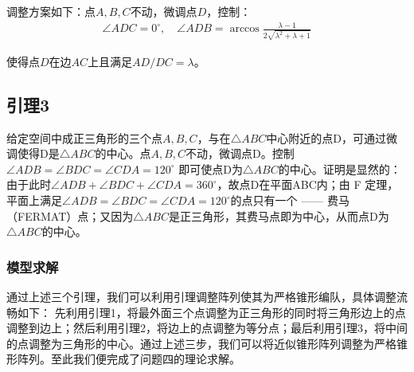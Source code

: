 \documentclass[withoutpreface,bwprint]{cumcmthesis} %
\begin{document}
调整方案如下：点\( A,B,C \)不动，微调点\( D \)，控制：
\begin{align}
    \angle ADC = 0^\circ, \quad \angle ADB = \arccos \frac{\lambda - 1}{2\sqrt{\lambda^2 + \lambda + 1}}
\end{align}

使得点\( D \)在边\( AC \)上且满足\( AD/DC = \lambda \)。
\subsection*{引理3} 
给定空间中成正三角形的三个点\(A,B,C\)，与在\(\triangle ABC\)中心附近的点D，可通过微调使得D是\(\triangle ABC\)的中心。点\(A,B,C\)不动，微调点D。控制
\(\angle ADB = \angle BDC = \angle CDA = 120^\circ\)
即可使点D为\(\triangle ABC\)的中心。证明是显然的：由于此时\(\angle ADB + \angle BDC + \angle CDA = 360^\circ\)，故点D在平面ABC内；由 F 定理，平面上满足\(\angle ADB = \angle BDC = \angle CDA = 120^\circ\)的点只有一个 —— 费马（FERMAT）点；又因为\(\triangle ABC\)是正三角形，其费马点即为中心，从而点D为\(\triangle ABC\)的中心。

\subsubsection{模型求解}
通过上述三个引理，我们可以利用引理调整阵列使其为严格锥形编队，具体调整流畅如下：
先利用引理1，将最外面三个点调整为正三角形的同时将三角形边上的点调整到边上；然后利用引理2，将边上的点调整为等分点；最后利用引理3，将中间的点调整为三角形的中心。通过上述三步，我们可以将近似锥形阵列调整为严格锥形阵列。至此我们便完成了问题四的理论求解。
\end{document}
